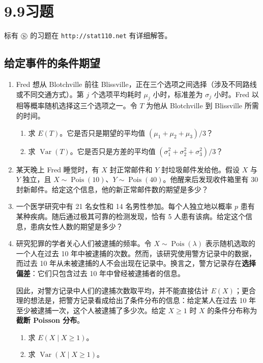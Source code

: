 \documentclass[UTF8, 12pt, fontset=fandol, oneside]{ctexart}
\begin{document}
\section*{9.9\quad 习题}

标有 $\circledS$ 的习题在 \texttt{http://stat110.net} 有详细解答。

\subsection*{给定事件的条件期望}

\begin{enumerate}
  \item Fred 想从 Blotchville 前往 Blissville，正在三个选项之间选择（涉及不同路线或不同交通方式）。第 $j$ 个选项平均耗时 $\mu_j$ 小时，标准差为 $\sigma_j$ 小时。Fred 以相等概率随机选择这三个选项之一。令 $T$ 为他从 Blotchville 到 Blissville 所需的时间。
  \begin{enumerate}
    \item[(a)] 求 $E(T)$。它是否只是期望的平均值 $(\mu_1+\mu_2+\mu_3)/3$？
    \item[(b)] 求 $\operatorname{Var}(T)$。它是否只是方差的平均值 $(\sigma_1^2+\sigma_2^2+\sigma_3^2)/3$？
  \end{enumerate}

  \item 某天晚上 Fred 睡觉时，有 $X$ 封正常邮件和 $Y$ 封垃圾邮件发给他。假设 $X$ 与 $Y$ 独立，且 $X\sim\operatorname{Pois}(10)$、$Y\sim\operatorname{Pois}(40)$。他醒来后发现收件箱里有 30 封新邮件。给定这个信息，他的新正常邮件数的期望是多少？

  \item 一个医学研究中有 21 名女性和 14 名男性参加。每个人独立地以概率 $p$ 患有某种疾病。随后通过极其可靠的检测发现，恰有 5 人患有该病。给定这个信息，患病女性人数的期望是多少？

  \item 研究犯罪的学者关心人们被逮捕的频率。令 $X\sim\operatorname{Pois}(\lambda)$ 表示随机选取的一个人在过去 10 年中被逮捕的次数。然而，该研究使用警方记录中的数据，而过去 10 年从未被逮捕的人不会出现在记录中。换言之，警方记录存在\textbf{选择偏差}：它们只包含过去 10 年中曾经被逮捕者的信息。

  因此，对警方记录中人们的逮捕次数取平均，并不能直接估计 $E(X)$；更合理的想法是，把警方记录看成给出了条件分布的信息：给定某人在过去 10 年至少被逮捕一次，这个人被逮捕了多少次。给定 $X\ge1$ 时 $X$ 的条件分布称为\textbf{截断 Poisson 分布}。
  \begin{enumerate}
    \item[(a)] 求 $E(X\mid X\ge1)$。
    \item[(b)] 求 $\operatorname{Var}(X\mid X\ge1)$。
  \end{enumerate}


\end{enumerate}
\end{document}
